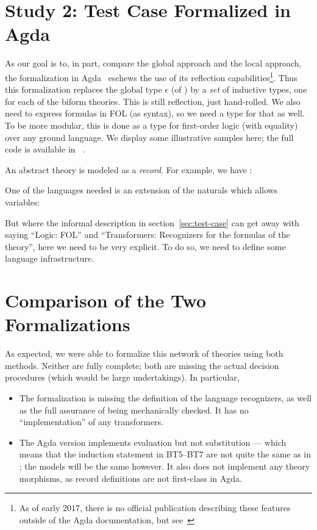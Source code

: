 \documentclass[fleqn]{llncs}
\newcommand{\appendixref}[1]
  {\iftoggle{cicm}
    {appendix #1 of \cite{CaretteFarmerArxiv17}}
    {appendix #1}%
  }
\begin{document}
\section{Study 2: Test Case Formalized in Agda}\label{sec:agda}

As our goal is to, in part, compare the global approach and the local
approach, the formalization in Agda~\cite{Norell09,AgdaWiki} eschews the use of
its reflection capabilities\footnote{As of early $2017$, there is no official
publication describing these features outside of the Agda
documentation, but see~\cite{VanDerWalt12,VanDerWaltSwierstra12}}.
Thus this formalization replaces the global type $\epsilon$ (of
{\churchuqe}) by a \emph{set} of inductive types, one for each of the
biform theories.  This is still reflection, just hand-rolled.  We also
need to express formulas in FOL (as syntax), so we need a type for
that as well.  To be more modular, this is done as a type for
first-order logic (with equality) over any ground language.
We display some illustrative samples here; the full code is available
in~\appendixref{B}.

\iffalse
and at~\cite{agda-code}.
\fi

An abstract theory is modeled as a \emph{record}.  For example, we have
:

One of the languages needed is an extension of the naturals which
allows variables:



But where the informal description in section~\ref{sec:test-case} can
get away with saying ``Logic: FOL'' and ``Transformers: Recognizers for
the formulas of the theory'', here we need to be very explicit.  To do
so, we need to define some language infrastructure.







\section{Comparison of the Two Formalizations}\label{sec:comparison}

As expected, we were able to formalize this network of theories using
both methods.  Neither are fully complete; both are missing the actual
decision procedures (which would be large undertakings).  In particular,
\begin{itemize}
\item The {\churchuqe} formalization is missing the definition of the language
recognizers, as well as the full assurance of being mechanically checked.
It has no ``implementation'' of any transformers.
\item The Agda version implements evaluation but not substitution --- which means
that the induction statement in BT5--BT7 are not quite the same as in
{\churchuqe}; the models will be the same however.  It also does not implement
any theory morphisms, as record definitions are not first-class in Agda. 
\end{itemize}
\end{document}
